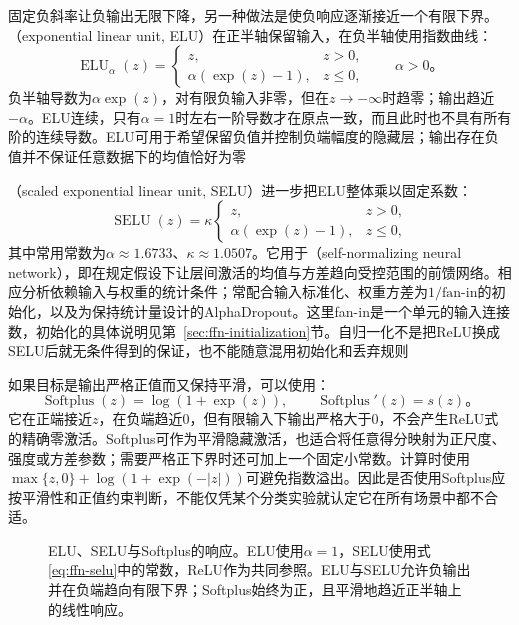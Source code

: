 固定负斜率让负输出无限下降，另一种做法是使负响应逐渐接近一个有限下界。（exponential linear unit, ELU）在正半轴保留输入，在负半轴使用指数曲线：
\begin{equation}
  \operatorname{ELU}_{\alpha}(z)=
  \begin{cases}
    z,&z>0,\\
    \alpha(\exp(z)-1),&z\leq0,
  \end{cases}
  \qquad \alpha>0\text{。}
  \label{eq:ffn-elu}
\end{equation}
负半轴导数为$\alpha\exp(z)$，对有限负输入非零，但在$z\to-\infty$时趋零；输出趋近$-\alpha$。ELU连续，只有$\alpha=1$时左右一阶导数才在原点一致，而且此时也不具有所有阶的连续导数。ELU可用于希望保留负值并控制负端幅度的隐藏层；输出存在负值并不保证任意数据下的均值恰好为零

（scaled exponential linear unit, SELU）进一步把ELU整体乘以固定系数：
\begin{equation}
  \operatorname{SELU}(z)=\kappa
  \begin{cases}
    z,&z>0,\\
    \alpha(\exp(z)-1),&z\leq0,
  \end{cases}
  \label{eq:ffn-selu}
\end{equation}
其中常用常数为$\alpha\approx1.6733$、$\kappa\approx1.0507$。它用于（self-normalizing neural network），即在规定假设下让层间激活的均值与方差趋向受控范围的前馈网络。相应分析依赖输入与权重的统计条件；常配合输入标准化、权重方差为$1/\mathrm{fan\text{-}in}$的初始化，以及为保持统计量设计的AlphaDropout。这里fan-in是一个单元的输入连接数，初始化的具体说明见第~\ref{sec:ffn-initialization}节。自归一化不是把ReLU换成SELU后就无条件得到的保证，也不能随意混用初始化和丢弃规则

如果目标是输出严格正值而又保持平滑，可以使用：
\begin{equation}
  \operatorname{Softplus}(z)=\log(1+\exp(z)),
  \qquad \operatorname{Softplus}'(z)=s(z)\text{。}
  \label{eq:ffn-softplus}
\end{equation}
它在正端接近$z$，在负端趋近$0$，但有限输入下输出严格大于$0$，不会产生ReLU式的精确零激活。Softplus可作为平滑隐藏激活，也适合将任意得分映射为正尺度、强度或方差参数；需要严格正下界时还可加上一个固定小常数。计算时使用$\max\{z,0\}+\log(1+\exp(-|z|))$可避免指数溢出。因此是否使用Softplus应按平滑性和正值约束判断，不能仅凭某个分类实验就认定它在所有场景中都不合适。

\begin{figure}[htbp]
  \centering
  
  \caption{ELU、SELU与Softplus的响应。ELU使用$\alpha=1$，SELU使用式\eqref{eq:ffn-selu}中的常数，ReLU作为共同参照。ELU与SELU允许负输出并在负端趋向有限下界；Softplus始终为正，且平滑地趋近正半轴上的线性响应。}
  \label{fig:ffn-activation-exponential}
\end{figure}

